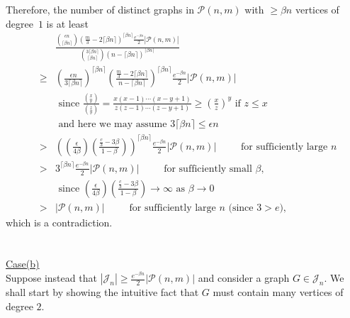 \documentclass{article}
\newtheorem{Proof of Theorem}{Proof of Theorem}
\begin{document}
Therefore, the number of distinct graphs in $\mathcal{P}(n,m)$ with $\geq \beta n$ vertices of degree~$1$ is at least 
\begin{eqnarray*}
& & \frac{
\left(^{\phantom{p} \epsilon n}_{\lceil \beta n \rceil}\right) 
\left( \frac{m}{3}-2\lceil \beta n \rceil \right)^{\lceil \beta n \rceil} 
\frac{e^{-\beta n}}{2} |\mathcal{P}(n,m)|}
{\left(^{3 \lceil \beta n \rceil} _{\phantom{l} \lceil \beta n \rceil} \right)  
(n- \lceil \beta n \rceil)^{\lceil \beta n \rceil}
} \\
& \geq & \left( \frac{\epsilon n}{3 \lceil \beta n \rceil} \right) ^{\lceil \beta n \rceil}
\left( \frac{
\frac{m}{3}-2\lceil \beta n \rceil}
{n- \lceil \beta n \rceil} \right)^{\lceil \beta n \rceil} 
\frac{e^{-\beta n}}{2} |\mathcal{P}(n,m)| \\
& &
\textrm{ since } \frac{ \left(^{x}_{y}\right) }{ \left(^{z}_{y}\right) } 
= \frac{x(x-1) \cdots (x-y+1)}{z(z-1) \cdots (z-y+1)}
\geq \left( \frac{x}{z} \right)^{y}
\textrm{ if } z \leq x \\
& & \textrm{ and here we may assume }
3 \lceil \beta n \rceil \leq \epsilon n \\
& > & \left( \left( \frac{\epsilon}{4 \beta} \right) \left( \frac{\frac{c}{3}-3 \beta}{1-\beta} \right) \right)
^{\lceil \beta n \rceil} \frac{e^{- \beta n}}{2} |\mathcal{P}(n,m)| 
\phantom{www} \textrm{ for sufficiently large $n$} \\
& > & 3^{\lceil \beta n \rceil} \frac{e^{- \beta n}}{2} |\mathcal{P}(n,m)|
\phantom{www} \textrm{ for sufficiently small $\beta$}, \\
& & \textrm{ since } 
\left( \frac{\epsilon}{4\beta} \right) \left( \frac{\frac{c}{3}-3\beta}{1-\beta} \right) \to \infty
\textrm{ as } \beta \to 0 \\
& > & |\mathcal{P}(n,m)|
\phantom{www} \textrm{ for sufficiently large $n$ (since $3>e$),} 
\end{eqnarray*}
which is a contradiction. \\
\\
\\
\underline{Case(b)} \\
Suppose instead that $|\mathcal{J}_{n}| \geq \frac{e^{-\beta n}}{2} |\mathcal{P}(n,m)|$ 
and consider a graph $G \in \mathcal{J}_{n}$.
We shall start by showing the intuitive fact that $G$ must contain many vertices of degree $2$. 
\end{document}

